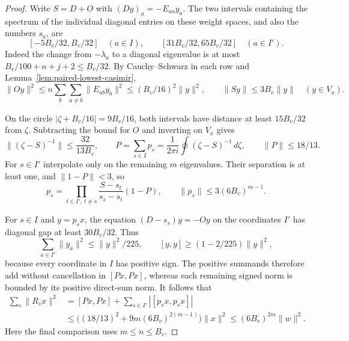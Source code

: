 \begin{proof}
Write \(S=D+O\) with \((Dy)_a=-E_{aa}y_a\). The two intervals
containing the spectrum of the individual diagonal entries on these
weight spaces, and also the numbers \(s_a\), are
\[
  [-5B_v/32,B_v/32]\quad(a\in I),\qquad
  [31B_v/32,65B_v/32]\quad(a\in I').
\]
Indeed the change from \(-\lambda_a\) to a diagonal eigenvalue is
at most \(B_v/100+n+j+2\le B_v/32\).
By Cauchy--Schwarz in each row and Lemma~\ref{lem:paired-lowest-casimir},
\[
 \|Oy\|^2\le n\sum_b\sum_{a\ne b}\|E_{ab}y_b\|^2
            \le (B_v/16)^2\|y\|^2,\qquad \|Sy\|\le3B_v\|y\|
 \quad(y\in V_x).
\]

On the circle \(|\zeta+B_v/16|=9B_v/16\), both intervals have
distance at least \(15B_v/32\) from \(\zeta\). Subtracting the bound
for \(O\) and inverting on \(V_x\) gives
\[
 \|(\zeta-S)^{-1}\|\le \frac{32}{13B_v},\qquad
 P=\sum_{s\in I}p_s=\frac{1}{2\pi i}\oint(\zeta-S)^{-1}\,d\zeta,
 \qquad \|P\|\le18/13 .
\]
For \(s\in I'\) interpolate only on the remaining \(m\) eigenvalues.
Their separation is at least one, and \(\|1-P\|<3\), so
\[
 p_s=\prod_{t\in I',\ t\ne s}\frac{S-s_t}{s_s-s_t}(1-P),
 \qquad \|p_s\|\le 3(6B_v)^{m-1}.
\]

For \(s\in I\) and \(y=p_s x\), the equation
\((D-s_s)y=-Oy\) on the coordinates \(I'\) has diagonal gap
at least \(30B_v/32\). Thus
\[
  \sum_{a\in I'}\|y_a\|^2\le \|y\|^2/225,\qquad
  [y,y]\ge (1-2/225)\|y\|^2 ,
\]
because every coordinate in \(I\) has positive sign.
The positive summands therefore add without cancellation in
\([Px,Px]\), whereas each remaining signed norm is bounded by its
positive direct-sum norm. It follows that
\[
 \begin{aligned}
 \sum_s\|R_sx\|^2
 &= [Px,Px]+\sum_{s\in I'}|[p_s x,p_s x]|\\
 &\le\big((18/13)^2+9m(6B_v)^{2(m-1)}\big)\|x\|^2
 \le(6B_v)^{2m}\|w\|^2 .
 \end{aligned}
\]
Here the final comparison uses \(m\le n\le B_v\).
\end{proof}
